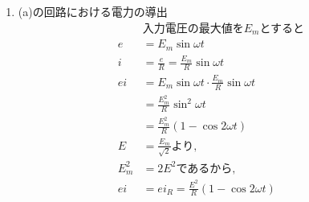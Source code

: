 \documentclass[twocolumn]{article}
\begin{document}
\begin{enumerate}
  \item (a)の回路における電力の導出
        \begin{align*}
                & \text{入力電圧の最大値を} E_m \text{とすると}                          \\
          e     & = E_m \sin \omega t                                       \\
          i     & = \frac{e}{R} = \frac{E_m}{R} \sin \omega t               \\
          ei    & = E_m \sin \omega t \cdot \frac{E_m}{R} \sin \omega t     \\
                & = \frac{E_m^2}{R} \sin^2 \omega t                         \\
                & = \frac{E_m^2}{R} \left( 1 - \cos 2 \omega t \right)      \\
          E     & = \frac{E_m}{\sqrt{2}} \text{より,}                         \\
          E_m^2 & = 2E^2 \text{であるから,}                                      \\
          ei    & = ei_R = \frac{E^2}{R} \left( 1 - \cos 2 \omega t \right) \\
        \end{align*}


\end{enumerate}
\end{document}
